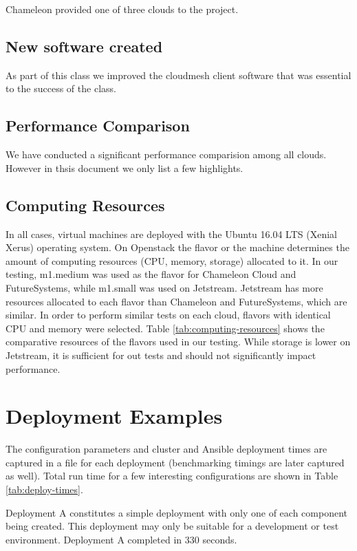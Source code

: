 \documentclass[sigconf]{acmart}
\begin{document}
Chameleon provided one of three clouds to the project.


\subsection{New software created}

As part of this class we improved the cloudmesh client software
\cite{www-cloudmesh-client}\cite{www-cloudmesh-cmd5}
\cite{www-cloudmesh-rest} that was essential to the success of the
class.

\subsection{Performance Comparison}

We have conducted a significant performance comparision among all
clouds. However in thsis document we only list a few highlights.

\subsection{Computing Resources}

In all cases, virtual machines are deployed with the Ubuntu 16.04 LTS
(Xenial Xerus) operating system.  On Openstack the flavor or the
machine determines the amount of computing resources (CPU, memory,
storage) allocated to it.  In our testing, m1.medium was used as the
flavor for Chameleon Cloud and FutureSystems, while  m1.small was used
on Jetstream.  Jetstream has more resources allocated to each flavor
than Chameleon and FutureSystems, which are similar.  In order to
perform similar tests on each cloud, flavors with identical CPU and
memory were selected. Table \ref{tab:computing-resources} shows the
comparative resources of the flavors used in our testing.  While
storage is lower on Jetstream, it is sufficient for out tests and
should not significantly impact performance. 

\section{Deployment Examples}

The configuration parameters and cluster and Ansible deployment times
are captured in a file for each deployment (benchmarking timings are
later captured as well).  Total run time for a few interesting
configurations are shown in Table \ref{tab:deploy-times}.

Deployment A constitutes a simple deployment with only one of each component
being created.  This deployment may only be suitable for a development
or test environment.  Deployment A completed in 330 seconds.
\end{document}
